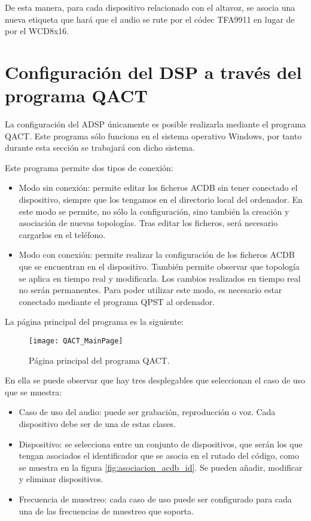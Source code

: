 De esta manera, para cada dispositivo relacionado con el altavoz, se asocia una nueva etiqueta que hará que el audio se rute por el códec TFA9911 en lugar de por el WCD8x16.

\section{Configuración del DSP a través del programa QACT}
La configuración del \gls{ADSP} únicamente es posible realizarla mediante el programa \gls{QACT}. Este programa sólo funciona en el sistema operativo Windows, por tanto durante esta sección se trabajará con dicho sistema.

Este programa permite dos tipos de conexión:
\begin{itemize}
	\item{Modo sin conexión: permite editar los ficheros \gls{ACDB} sin tener conectado el dispositivo, siempre que los tengamos en el directorio local del ordenador. En este modo se permite, no sólo la configuración, sino también la creación y asociación de nuevas topologías. Tras editar los ficheros, será necesario cargarlos en el teléfono.}
	\item{Modo con conexión: permite realizar la configuración de los ficheros \gls{ACDB} que se encuentran en el dispositivo. También permite observar que topología se aplica en tiempo real y modificarla. Los cambios realizados en tiempo real no serán permanentes. Para poder utilizar este modo, es necesario estar conectado mediante el programa \gls{QPST} al ordenador.}
\end{itemize}

La página principal del programa es la siguiente:

\begin{figure}[H]
	\centering
	\texttt{[image: QACT\_MainPage]}
	\caption{Página principal del programa QACT.} 
	\label{fig:qact_main}
\end{figure}

En ella se puede observar que hay tres desplegables que seleccionan el caso de uso que se muestra:
\begin{itemize}
	\item{Caso de uso del audio: puede ser grabación, reproducción o voz. Cada dispositivo debe ser de una de estas clases.}
	\item{Dispositivo: se selecciona entre un conjunto de dispositivos, que serán los que tengan asociados el identificador que se asocia en el rutado del código, como se muestra en la figura \ref{fig:asociacion_acdb_id}. Se pueden añadir, modificar y eliminar dispositivos.}
	\item{Frecuencia de muestreo: cada caso de uso puede ser configurado para cada una de las frecuencias de muestreo que soporta.}
\end{itemize}

